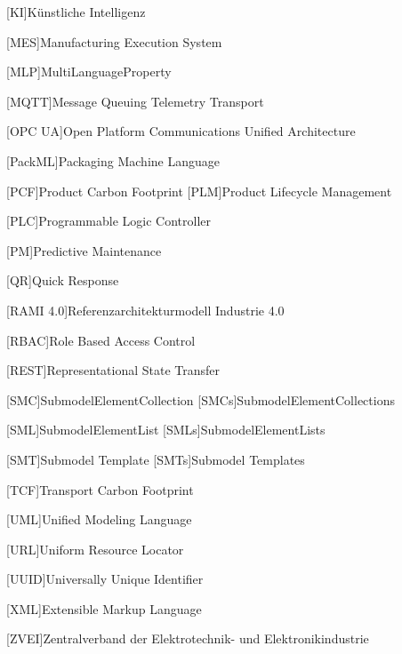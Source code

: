 {\begin{acronym}[RAMI 4.0]
[KI]{Künstliche Intelligenz}

[MES]{Manufacturing Execution System}

[MLP]{MultiLanguageProperty}

[MQTT]{Message Queuing Telemetry Transport}

[OPC UA]{Open Platform Communications Unified Architecture}

[PackML]{Packaging Machine Language}

[PCF]{Product Carbon Footprint}
[PLM]{Product Lifecycle Management}

[PLC]{Programmable Logic Controller}

[PM]{Predictive Maintenance}

[QR]{Quick Response}

[RAMI 4.0]{Referenzarchitekturmodell Industrie 4.0}

[RBAC]{Role Based Access Control}

[REST]{Representational State Transfer}

[SMC]{SubmodelElementCollection}
[SMCs]{SubmodelElementCollections}

[SML]{SubmodelElementList}
[SMLs]{SubmodelElementLists}

[SMT]{Submodel Template}
[SMTs]{Submodel Templates}

[TCF]{Transport Carbon Footprint}

[UML]{Unified Modeling Language}

[URL]{Uniform Resource Locator}

[UUID]{Universally Unique Identifier}

[XML]{Extensible Markup Language}

[ZVEI]{Zentralverband der Elektrotechnik- und Elektronikindustrie}
\end{acronym}
}

\newpage